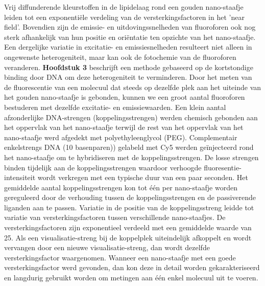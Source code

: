 Vrij diffunderende kleurstoffen in de lipidelaag rond een gouden nano-staafje leiden tot een exponentiële verdeling van de versterkingsfactoren in het ’near field’. Bovendien zijn de emissie- en uitdovingssnelheden van fluoroforen ook nog sterk afhankelijk van hun positie en oriëntatie ten opzichte van het nano-staafje. Een dergelijke variatie in excitatie- en emissiesnelheden resulteert niet alleen in ongewenste heterogeniteit, maar kan ook de fotochemie van de fluoroforen veranderen. \textbf{Hoofdstuk 3} beschrijft  een methode gebaseerd op de kortstondige binding door DNA om deze heterogeniteit te verminderen. Door het meten van de fluorescentie van een molecuul dat steeds op dezelfde plek aan het uiteinde van het gouden nano-staafje is gebonden, kunnen we een groot aantal fluoroforen bestuderen met dezelfde excitatie- en emissiewaarden. Een klein aantal afzonderlijke DNA-strengen (koppelingsstrengen) werden chemisch gebonden aan het oppervlak van het nano-staafje terwijl de rest van het oppervlak van het nano-staafje werd afgedekt met polyethyleenglycol (PEG). Complementair enkelstrengs DNA (10 basenparen)) gelabeld met Cy5 werden geïnjecteerd rond het nano-staafje om te hybridiseren met de koppelingsstrengen. De losse strengen binden tijdelijk aan de koppelingsstrengen waardoor verhoogde fluoresentie-intensiteit wordt verkregen met een typische duur van een paar seconden. Het gemiddelde aantal koppelingsstrengen kon tot één per nano-staafje worden gereguleerd door de verhouding tussen de koppelingsstrengen en de passiverende liganden aan te passen. Variatie in de positie van de koppelingsstreng leidde tot variatie van versterkingsfactoren tussen verschillende nano-staafjes. De versterkingsfactoren zijn exponentieel verdeeld met een gemiddelde waarde van 25. Als een visualisatie-streng bij de koppelplek uiteindelijk afkoppelt en wordt vervangen door een nieuwe visualisatie-streng, dan wordt dezelfde versterkingsfactor waargenomen. Wanneer een nano-staafje met een goede versterkingsfactor werd gevonden, dan kon deze in detail worden gekarakteriseerd en langdurig gebruikt worden om metingen aan één enkel molecuul uit te voeren.


